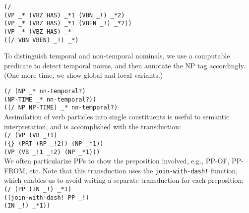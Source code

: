 \documentclass[a4,11pt]{article}
\begin{document}
\footnotesize
\hspace*{0em} \texttt{(/} \\
\hspace*{1.8em} \texttt{(VP \_* (VBZ HAS) \_*1 (VBN \_!) \_*2)}\\
\hspace*{1.8em} \texttt{(VP \_* (VBZ HAS) \_*1 (VBEN \_!) \_*2))}\\

\footnotesize
\hspace*{0em}\texttt{(VP \_* (VBZ HAS) \_*}\\
\hspace*{2em}\texttt{((/ VBN VBEN) \_!) \_*)}\\
\normalsize

To distinguish temporal and non-temporal nominals, we use a computable predicate to detect temporal nouns, and then annotate the NP tag accordingly. (One more time, we show global and local variants.)

\small
\texttt{(/ (NP \_* nn-temporal?)}\\
\hspace*{3em}\texttt{(NP-TIME \_* nn-temporal?))}\\

\texttt{((/ NP NP-TIME) \_* nn-temporal?)}\\

\normalsize
Assimilation of verb particles into single constituents is useful to semantic interpretation, and is accomplished with the transduction:\\

\footnotesize
\texttt{(/ (VP (VB \_!1)}\\
\hspace*{6em}\texttt{(\{\} (PRT (RP \_!2)) (NP \_*1))}\\
\hspace*{3em}\texttt{(VP (VB \_!1 \_!2)  (NP \_*1)))}\\

\normalsize
We often particularize PPs to show the preposition involved, e.g., PP-OF, PP-FROM,  etc.  Note that this transduction uses the \texttt{join-with-dash!} function, which enables us to avoid writing a separate transduction for each preposition:\\
\small
\hspace*{1em}\texttt{(/ (PP (IN \_!) \_*1)}\\
\hspace*{3em}\texttt{((join-with-dash!~PP \_!)}\\ 
\hspace*{3.8em}\texttt{(IN \_!) \_*1))}
\end{document}
